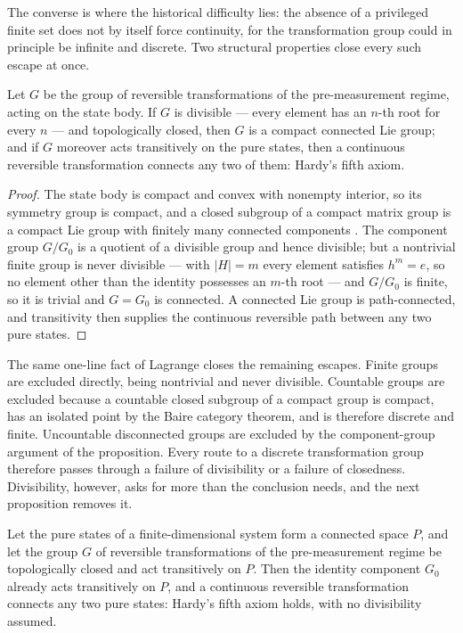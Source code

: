 The converse is where the historical difficulty lies: the absence of a privileged finite set does
not by itself force continuity, for the transformation group could in principle be infinite and
discrete. Two structural properties close every such escape at once.

\begin{proposition}\label{prop:divisible-closed}
Let $G$ be the group of reversible transformations of the pre-measurement regime, acting on the
state body. If $G$ is divisible --- every element has an $n$-th root for every $n$ --- and
topologically closed, then $G$ is a compact connected Lie group; and if $G$ moreover acts
transitively on the pure states, then a continuous reversible transformation connects any two of
them: Hardy's fifth axiom.
\end{proposition}

\begin{proof}
The state body is compact and convex with nonempty interior, so its symmetry group is compact, and
a closed subgroup of a compact matrix group is a compact Lie group with finitely many connected
components \autocite{broeckertomdieck1985compact}. The component group $G/G_{0}$ is a quotient of a
divisible group and hence divisible; but a nontrivial finite group is never divisible --- with
$\lvert H\rvert = m$ every element satisfies $h^{m} = e$, so no element other than the identity
possesses an $m$-th root --- and $G/G_{0}$ is finite, so it is trivial and $G = G_{0}$ is connected.
A connected Lie group is path-connected, and transitivity then supplies the continuous reversible
path between any two pure states.
\end{proof}

The same one-line fact of Lagrange closes the remaining escapes. Finite groups are excluded
directly, being nontrivial and never divisible. Countable groups are excluded because a
countable closed subgroup of a compact group is compact, has an isolated point by the Baire
category theorem, and is therefore discrete and finite. Uncountable disconnected groups are
excluded by the component-group argument of the proposition. Every route to a discrete
transformation group therefore passes through a failure of divisibility or a failure of
closedness. Divisibility, however, asks for more than the conclusion needs, and the next
proposition removes it.

\begin{proposition}\label{prop:connected-transitive}
Let the pure states of a finite-dimensional system form a connected space $P$, and let the group
$G$ of reversible transformations of the pre-measurement regime be topologically closed and act
transitively on $P$. Then the identity component $G_0$ already acts transitively on $P$, and a
continuous reversible transformation connects any two pure states: Hardy's fifth axiom holds,
with no divisibility assumed.
\end{proposition}

